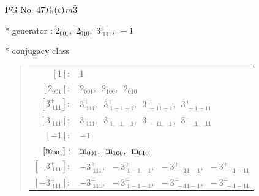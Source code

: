 \documentclass[fleqn,8pt]{jsarticle}
\begin{document}
\setcounter{MaxMatrixCols}{32}

\renewcommand{\tablename}{Table~}
\renewcommand{\figurename}{Figure~}
\begin{center}
\LARGE
PG No. 47\quad$T_{\rm h}(c)$\quad$m\bar{3}$\quad[ cubic ]
\end{center}

* generator : $2{}_{001},\,\,2{}_{010},\,\,3^{+}_{\,\,111},\,\,-1$

* conjugacy class
\begin{quote}
\begin{tabular}{rl}
$ [1]: $ & $ 1 $ \\
$ [2{}_{001}]: $ & $ 2{}_{001},\,\,\,2{}_{100},\,\,\,2{}_{010} $ \\
$ [3^{+}_{\,\,111}]: $ & $ 3^{+}_{\,\,111},\,\,\,3^{+}_{\,\,1-1-1},\,\,\,3^{+}_{\,\,-11-1},\,\,\,3^{+}_{\,\,-1-11} $ \\
$ [3^{-}_{\,\,111}]: $ & $ 3^{-}_{\,\,111},\,\,\,3^{-}_{\,\,1-1-1},\,\,\,3^{-}_{\,\,-11-1},\,\,\,3^{-}_{\,\,-1-11} $ \\
$ [-1]: $ & $ -1 $ \\
$ [{\rm m}_{001}]: $ & $ {\rm m}_{001},\,\,\,{\rm m}_{100},\,\,\,{\rm m}_{010} $ \\
$ [-3^{+}_{\,\,111}]: $ & $ -3^{+}_{\,\,111},\,\,\,-3^{+}_{\,\,1-1-1},\,\,\,-3^{+}_{\,\,-11-1},\,\,\,-3^{+}_{\,\,-1-11} $ \\
$ [-3^{-}_{\,\,111}]: $ & $ -3^{-}_{\,\,111},\,\,\,-3^{-}_{\,\,1-1-1},\,\,\,-3^{-}_{\,\,-11-1},\,\,\,-3^{-}_{\,\,-1-11} $
\end{tabular}
\end{quote}
\end{document}
